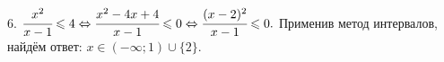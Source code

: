 6. $\cfrac{x^2}{x-1}\leqslant4 \Leftrightarrow \cfrac{x^2-4x+4}{x-1}\leqslant0 \Leftrightarrow \cfrac{(x-2)^2}{x-1}\leqslant0.$ Применив метод интервалов, найдём ответ: $x\in(-\infty;1)\cup\{2\}.$\\
